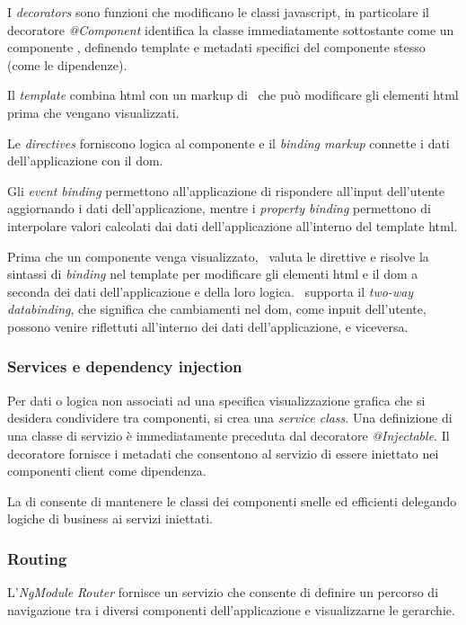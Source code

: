 I \textit{decorators} sono funzioni che modificano le classi \gls{javascript}, in particolare il decoratore \textit{@Component} identifica la classe immediatamente sottostante come un componente \angular, definendo template e metadati specifici del componente stesso (come le dipendenze).

Il \textit{template} combina \acrshort{html} con un markup di \angular~che può modificare gli elementi \acrshort{html} prima che vengano visualizzati.

Le \textit{directives} forniscono logica al componente e il \textit{binding markup} connette i dati dell'applicazione con il \gls{dom}.

Gli \textit{event binding} permettono all'applicazione di rispondere all'input dell'utente aggiornando i dati dell'applicazione, mentre i \textit{property binding} permettono di interpolare valori calcolati dai dati dell'applicazione all'interno del template \acrshort{html}.

Prima che un componente venga visualizzato, \angular~valuta le direttive e risolve la sintassi di \textit{binding} nel template per modificare gli elementi \acrshort{html} e il \acrshort{dom} a seconda dei dati dell'applicazione e della loro logica. \angular~supporta il \textit{two-way databinding}, che significa che cambiamenti nel \acrshort{dom}, come inpuit dell'utente, possono venire riflettuti all'interno dei dati dell'applicazione, e viceversa.

\subsubsection{Services e dependency injection}

Per dati o logica non associati ad una specifica visualizzazione grafica che si desidera condividere tra componenti, si crea una \textit{service class}. Una definizione di una classe di servizio è immediatamente preceduta dal decoratore \textit{@Injectable}. Il decoratore fornisce i metadati che consentono al servizio di essere iniettato nei componenti client come dipendenza.

La \gls{di}  consente di mantenere le classi dei componenti snelle ed efficienti delegando logiche di business ai servizi iniettati.

\subsubsection{Routing}

L'\textit{NgModule} \textit{Router} fornisce un servizio che consente di definire un percorso di navigazione tra i diversi componenti dell'applicazione e visualizzarne le gerarchie.

